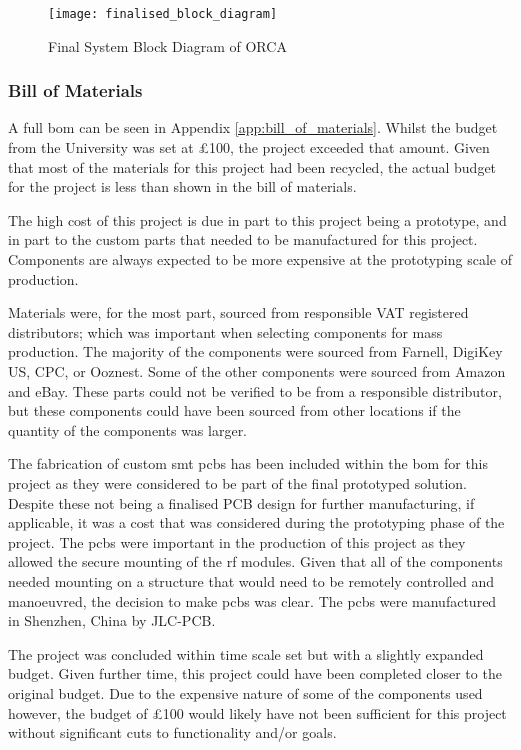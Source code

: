 \documentclass [12pt]{article}
\begin{document}
\begin{figure}[H]
\centerline{\texttt{[image: finalised\_block\_diagram]}}
\caption{Final System Block Diagram of ORCA}
\label{fig:finalised_block_diagram}
\end{figure}


\subsubsection{Bill of Materials}

A full \gls{bom} can be seen in Appendix \ref{app:bill_of_materials}. Whilst the budget from the University was set at £100, the project exceeded that amount. Given that most of the materials for this project had been recycled, the actual budget for the project is less than shown in the bill of materials.

The high cost of this project is due in part to this project being a prototype, and in part to the custom parts that needed to be manufactured for this project. Components are always expected to be more expensive at the prototyping scale of production.

Materials were, for the most part, sourced from responsible VAT registered distributors; which was important when selecting components for mass production. The majority of the components were sourced from Farnell, DigiKey US, CPC, or Ooznest. Some of the other components were sourced from Amazon and eBay. These parts could not be verified to be from a responsible distributor, but these components could have been sourced from other locations if the quantity of the components was larger. 

The fabrication of custom \gls{smt} \gls{pcb}s has been included within the \gls{bom} for this project as they were considered to be part of the final prototyped solution. Despite these not being a finalised PCB design for further manufacturing, if applicable, it was a cost that was considered during the prototyping phase of the project. The \gls{pcb}s were important in the production of this project as they allowed the secure mounting of the \gls{rf} modules. Given that all of the components needed mounting on a structure that would need to be remotely controlled and manoeuvred, the decision to make \gls{pcb}s was clear. The \gls{pcb}s were manufactured in Shenzhen, China by JLC-PCB.

The project was concluded within time scale set but with a slightly expanded budget. Given further time, this project could have been completed closer to the original budget. Due to the expensive nature of some of the components used however, the budget of £100 would likely have not been sufficient for this project without significant cuts to functionality and/or goals.
\end{document}
